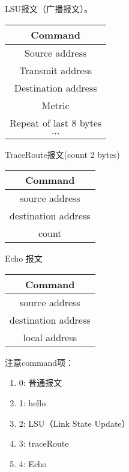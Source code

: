 \documentclass[15pt]{ctexart}
\begin{document}
	LSU报文（广播报文）。
	\begin{table}[H]
	\centering
		\begin{tabular}{|c|}
			\hline
			Command \\
			\hline
			Source address \\
			\hline
			Transmit address \\
			\hline
			Destination address \\
			\hline
			Metric \\
			\hline
			Repeat of last 8 bytes \\
			\hline
			$\cdots$ \\
			\hline
		\end{tabular}		
	\end{table}

	TraceRoute报文(count 2 bytes)
	\begin{table}[H]
	\centering
		\begin{tabular}{|c|}
			\hline
			Command \\
			\hline
			source address \\
			\hline
			destination address \\
			\hline
			count \\
			\hline
		\end{tabular}		
	\end{table}	

	Echo 报文
	\begin{table}[H]
	\centering
		\begin{tabular}{|c|}
			\hline
			Command \\
			\hline
			source address \\
			\hline
			destination address \\
			\hline
			local address \\
			\hline
		\end{tabular}		
	\end{table}
	注意command项：
	\begin{enumerate}[]
		\item 0: 普通报文
		\item 1: hello
		\item 2: LSU（Link State Update）
		\item 3: traceRoute
		\item 4: Echo
	\end{enumerate}

\end{document}
